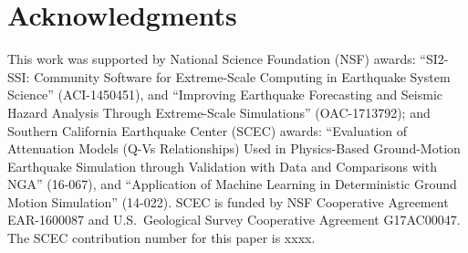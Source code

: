 
\section{Acknowledgments}
\small

This work was supported by National Science Foundation (NSF) awards: ``SI2-SSI: Community Software for Extreme-Scale Computing in Earthquake System Science'' (ACI-1450451), and ``Improving Earthquake Forecasting and Seismic Hazard Analysis Through Extreme-Scale Simulations'' (OAC-1713792); and Southern California Earthquake Center (SCEC) awards: ``Evaluation of Attenuation Models (Q-Vs Relationships) Used in Physics-Based Ground-Motion Earthquake Simulation through Validation with Data and Comparisons with NGA'' (16-067), and ``Application of Machine Learning in Deterministic Ground Motion Simulation'' (14-022). SCEC is funded by NSF Cooperative Agreement EAR-1600087 and U.S.~Geological Survey Cooperative Agreement G17AC00047. The SCEC contribution number for this paper is xxxx.


